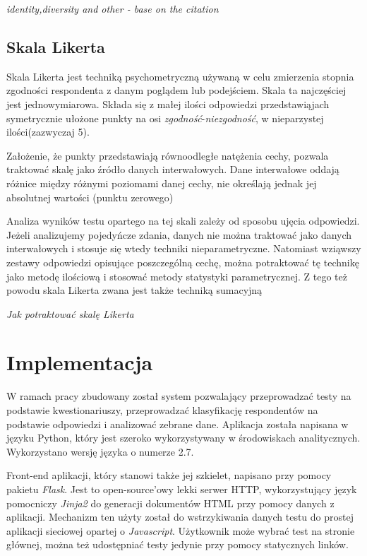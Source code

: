 \documentclass[12pt,a4paper,oneside]{report} %
\begin{document}
\emph{identity,diversity and other - base on the citation}

\section{Skala Likerta}

Skala Likerta jest techniką psychometryczną używaną w celu zmierzenia stopnia zgodności respondenta z danym poglądem lub podejściem. Skala ta najczęściej jest jednowymiarowa. Składa się z małej ilości odpowiedzi przedstawiąjach symetrycznie ułożone punkty na osi \emph{zgodność}-\emph{niezgodność}, w nieparzystej ilości(zazwyczaj 5). \cite{bertram}

Założenie, że punkty przedstawiają równoodległe natężenia cechy, pozwala traktować skalę jako źródło danych interwałowych. Dane interwałowe oddają różnice między różnymi poziomami danej cechy, nie określają jednak jej absolutnej wartości (punktu zerowego)  \cite{bertram}

Analiza wyników testu opartego na tej skali zależy od sposobu ujęcia odpowiedzi. Jeżeli analizujemy pojedyńcze zdania, danych nie można traktować jako danych interwałowych i stosuje się wtedy techniki nieparametryczne. Natomiast wziąwszy zestawy odpowiedzi opisujące poszczególną cechę, można potraktować tę technikę jako metodę ilościową i stosować metody statystyki parametrycznej. \cite{joe} Z tego też powodu skala Likerta zwana jest także techniką sumacyjną

\emph{Jak potraktować skalę Likerta}









\chapter{Implementacja}

W ramach pracy zbudowany został system pozwalający przeprowadzać testy na podstawie kwestionariuszy, przeprowadzać klasyfikację respondentów na podstawie odpowiedzi i analizować zebrane dane. Aplikacja została napisana w języku Python, który jest szeroko wykorzystywany w środowiskach analitycznych. Wykorzystano wersję języka o numerze 2.7.

Front-end aplikacji, który stanowi także jej szkielet, napisano przy pomocy pakietu \emph{Flask}. Jest to open-source'owy lekki serwer HTTP, wykorzystujący język pomocniczy \emph{Jinja2} do generacji dokumentów HTML przy pomocy danych z aplikacji. Mechanizm ten użyty został do wstrzykiwania danych testu do prostej aplikacji sieciowej opartej o \emph{Javascript}. Użytkownik może wybrać test na stronie głównej, można też udostępniać testy jedynie przy pomocy statycznych linków.
\end{document}

